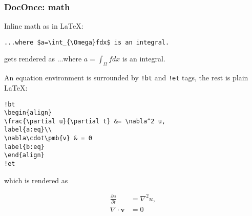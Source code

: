 \documentclass{beamer}
\begin{document}
\begin{frame}
\frametitle{DocOnce: math}

Inline math as in {\LaTeX}:



\begin{Verbatim}[numbers=none,fontsize=\fontsize{9pt}{9pt},baselinestretch=0.95]
...where $a=\int_{\Omega}fdx$ is an integral.

\end{Verbatim}

gets rendered as ...where $a=\int_{\Omega}fdx$ is an integral.

An equation environment is surrounded by \Verb?!bt? and \Verb?!et? tags,
the rest is plain {\LaTeX}:










\begin{Verbatim}[numbers=none,fontsize=\fontsize{9pt}{9pt},baselinestretch=0.95]
!bt
\begin{align}
\frac{\partial u}{\partial t} &= \nabla^2 u,
label{a:eq}\\
\nabla\cdot\pmb{v} & = 0
label{b:eq}
\end{align}
!et

\end{Verbatim}

which is rendered as

\begin{align}
\frac{\partial u}{\partial t} &= \nabla^2 u,
\label{_a:eq}\\
\nabla\cdot\pmb{v} & = 0
\label{_b:eq}
\end{align}
\end{frame}
\end{document}
